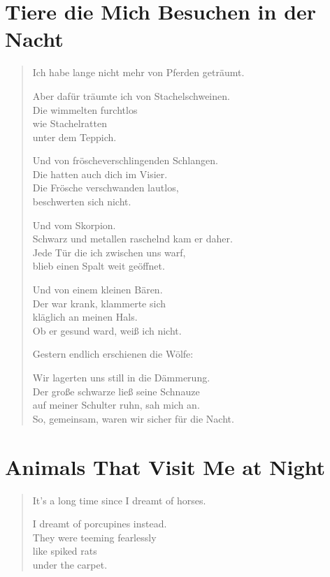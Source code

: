 
{\setlength{\stanzaskip}{0.5em}

\cleartoverso

\section{Tiere die Mich Besuchen in der Nacht}

\begin{verse}
Ich habe lange nicht mehr von Pferden geträumt.

Aber dafür träumte ich von Stachelschweinen.\\
Die wimmelten furchtlos\\
wie Stachelratten\\
unter dem Teppich.

Und von fröscheverschlingenden Schlangen.\\
Die hatten auch dich im Visier.\\
Die Frösche verschwanden lautlos,\\
beschwerten sich nicht.

Und vom Skorpion.\\
Schwarz und metallen raschelnd kam er daher.\\
Jede Tür die ich zwischen uns warf,\\
blieb einen Spalt weit geöffnet.

Und von einem kleinen Bären.\\
Der war krank, klammerte sich\\
kläglich an meinen Hals.\\
Ob er gesund ward, weiß ich nicht.

Gestern endlich erschienen die Wölfe:

Wir lagerten uns still in die Dämmerung.\\
Der große schwarze ließ seine Schnauze\\
auf meiner Schulter ruhn, sah mich an.\\
So, gemeinsam, waren wir sicher für die Nacht.
\end{verse}

\cleartorecto

\section{Animals That Visit Me at Night}

\begin{verse}
It's a long time since I dreamt of horses.

I dreamt of porcupines instead.\\
They were teeming fearlessly\\
like spiked rats\\
under the carpet.


\end{verse}}
